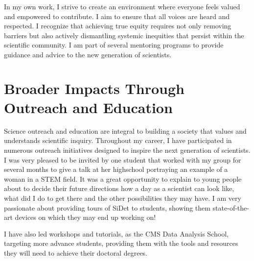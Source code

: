 {\begin{flushleft}
In my own work, I strive to create an environment where everyone feels valued and empowered to contribute. I aim to ensure that all voices are heard and respected. I recognize that achieving true equity requires not only removing barriers but also actively dismantling systemic inequities that persist within the scientific community. I am part of several mentoring programs to provide guidance and advice to the new generation of scientists.

\vspace{\baselineskip}
\section{Broader Impacts Through Outreach and Education}
\vspace{\baselineskip}
Science outreach and education are integral to building a society that values and understands scientific inquiry. Throughout my career, I have participated in numerous outreach initiatives designed to inspire the next generation of scientists. 
I was very pleased to be invited by one student that worked with my group for several months to give a talk at her highschool portraying an example of a woman in a STEM field. It was a great opportunity to explain to young people about to decide their future directions how a day as a scientist can look like, what did I do to get there and the other possibilities they may have. I am very passionate about providing tours of SiDet to students, showing them state-of-the-art devices on which they may end up working on! 

I have also led workshops and tutorials, as the CMS Data Analysis School, targeting more advance students, providing them with the tools and resources they will need to achieve their doctoral degrees. 


\vspace{\baselineskip}

\end{flushleft}}
